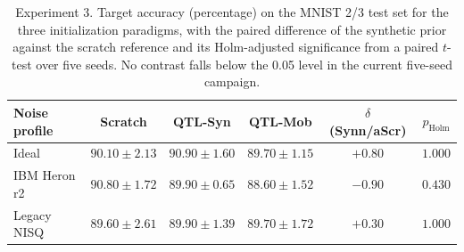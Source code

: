 \begin{table}[ht]
\centering
\caption{Experiment 3. Target accuracy (percentage) on the MNIST 2/3 test set
for the three initialization paradigms, with the paired difference of the
synthetic prior against the scratch reference and its Holm-adjusted
significance from a paired $t$-test over five seeds. No contrast falls below
the 0.05 level in the current five-seed campaign.}
\label{tab:exp3}
\begin{tabular}{lccccc}
\toprule
Noise profile & Scratch & QTL-Syn & QTL-Mob & $\delta$ (Synn/aScr) & $p_\text{Holm}$ \\
\midrule
Ideal       & $90.10 \pm 2.13$ & $90.90 \pm 1.60$ & $89.70 \pm 1.15$ & $+0.80$ & $1.000$ \\
IBM Heron r2 & $90.80 \pm 1.72$ & $89.90 \pm 0.65$ & $88.60 \pm 1.52$ & $-0.90$ & $0.430$ \\
Legacy NISQ & $89.60 \pm 2.61$ & $89.90 \pm 1.39$ & $89.70 \pm 1.72$ & $+0.30$ & $1.000$ \\
\bottomrule
\end{tabular}
\end{table}
